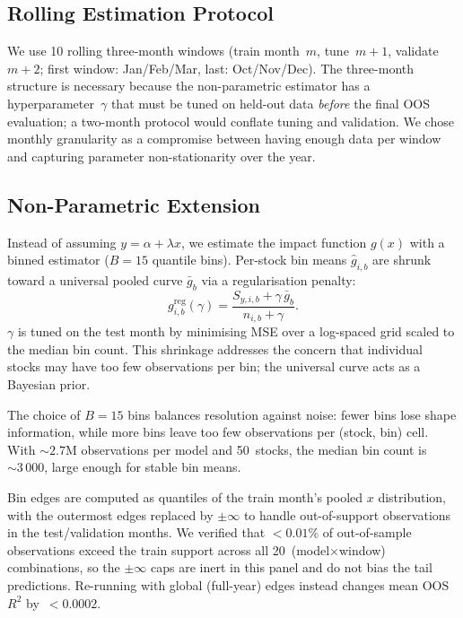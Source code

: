 \documentclass[11pt,a4paper]{article}
\begin{document}
\subsection{Rolling Estimation Protocol}

We use 10 rolling three-month windows (train month~$m$, tune~$m{+}1$,
validate~$m{+}2$; first window: Jan/Feb/Mar, last: Oct/Nov/Dec).  The
three-month structure is necessary because the non-parametric estimator
has a hyperparameter~$\gamma$ that must be tuned on held-out data
\emph{before} the final OOS evaluation; a two-month protocol would
conflate tuning and validation.  We chose monthly granularity as a
compromise between having enough data per window and capturing
parameter non-stationarity over the year.

\subsection{Non-Parametric Extension}
\label{sec:np}

Instead of assuming $y=\alpha+\lambda x$, we estimate the impact
function $g(x)$ with a binned estimator ($B{=}15$ quantile bins).
Per-stock bin means $\hat g_{i,b}$ are shrunk toward a universal pooled
curve $\bar g_b$ via a regularisation penalty:
\[
  g_{i,b}^{\mathrm{reg}}(\gamma)
    = \frac{S_{y,i,b} + \gamma\,\bar g_b}{n_{i,b}+\gamma}.
\]
$\gamma$ is tuned on the test month by minimising MSE over a log-spaced
grid scaled to the median bin count.  This shrinkage addresses the
concern that individual stocks may have too few observations per bin;
the universal curve acts as a Bayesian prior.

The choice of $B{=}15$ bins balances resolution against noise: fewer
bins lose shape information, while more bins leave too few observations
per (stock, bin) cell.  With ${\sim}2.7$M observations per model and
50~stocks, the median bin count is ${\sim}3\,000$, large enough for
stable bin means.

Bin edges are computed as quantiles of the train month's pooled $x$
distribution, with the outermost edges replaced by $\pm\infty$ to
handle out-of-support observations in the test/validation months.  We
verified that $<\!0.01\%$ of out-of-sample observations exceed the
train support across all 20~(model$\times$window) combinations, so the
$\pm\infty$ caps are inert in this panel and do not bias the tail
predictions.  Re-running with global (full-year) edges instead changes
mean OOS~$R^2$ by~$<\!0.0002$.

\end{document}
